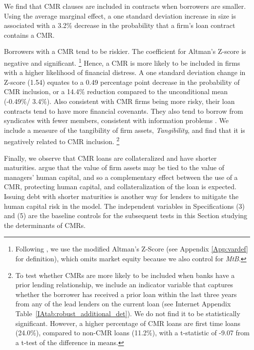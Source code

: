 \documentclass[a4paper,12pt]{article}
\begin{document}
We find that CMR clauses are included in contracts when borrowers are smaller.
Using the average marginal effect, a one standard deviation increase in size is associated with a 3.2\% decrease in the probability that a firm's loan contract contains a CMR.


Borrowers with a CMR tend to be riskier.
The coefficient for Altman's Z-score is negative and significant.%
    \footnote{Following \cite{Graham_2008}, we use the modified Altman's Z-Score (see Appendix \ref{App:vardef} for definition), which omits market equity because we also control for \textit{MtB}.}
Hence, a CMR is more likely to be included in firms with a higher likelihood of financial distress.
A one standard deviation change in Z-score (1.54) equates to a 0.49 percentage point decrease in the probability of CMR inclusion, or a 14.4\% reduction compared to the unconditional mean (-0.49\%/ 3.4\%).
Also consistent with CMR firms being more risky, their loan contracts tend to have more financial covenants.
They also tend to borrow from syndicates with fewer members, consistent with information problems \citep{Ivashina_2009}. 
We include a measure of the tangibility of firm assets, \textit{Tangibility}, and find that it is negatively related to CMR inclusion.%
    \footnote{To test whether CMRs are more likely to be included when banks have a prior lending relationship, we include an indicator variable that captures whether the borrower has received a prior loan within the last three years from any of the lead lenders on the current loan (see Internet Appendix Table~\ref{IAtab:robust_additional_det}). 
    We do not find it to be statistically significant.
    However, a higher percentage of CMR loans are first time loans (24.0\%), compared to non-CMR loans (11.2\%), with a t-statistic of -9.07 from a t-test of the difference in means.}



Finally, we observe that CMR loans are collateralized and have shorter maturities.
\cite{Hart_1994} argue that the value of firm assets may be tied to the value of managers' human capital, and so a complementary effect between the use of a CMR, protecting human capital, and collateralization of the loan is expected.
Issuing debt with shorter maturities is another way for lenders to mitigate the human capital risk in the \cite{Hart_1994} model.
The independent variables in Specifications (3) and (5) are the baseline controls for the subsequent tests in this Section studying the determinants of CMRs.
\end{document}
